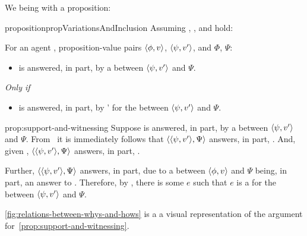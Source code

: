 \begin{note}
 We being with a proposition:

  \begin{restatable}[]{proposition}{propVariationsAndInclusion}
    \label{prop:support-and-witnessing}
    Assuming \linkW{}, \linkH{}, and \issueInclusion{} hold:

    For an agent \vAgent{}, proposition-value pairs \(\langle \phi, v \rangle\), \(\langle \psi, v' \rangle\), and  \(\Phi\), \(\Psi\):

    \begin{itemize}
    \item
      \qWhyV{} is answered, in part, by a \ros{} between \(\langle \psi, v' \rangle\) and \(\Psi\).
    \end{itemize}

    \emph{Only if}

    \begin{itemize}
    \item
      \qHowV{} is answered, in part, by \vAgent{}'  for the \ros{} between \(\langle \psi, v' \rangle\) and \(\Psi\).
    \end{itemize}
    \vspace{-\baselineskip}
  \end{restatable}

  \begin{argument}{prop:support-and-witnessing}
    Suppose \qWhyV{} is answered, in part, by a \ros{} between \(\langle \psi, v' \rangle\) and \(\Psi\).
    From~\linkW{} it is immediately follows that \(\langle \langle \psi, v' \rangle, \Psi \rangle\) answers, in part, \qWhy{}.
    And, given \issueInclusion{}, \(\langle \langle \psi, v' \rangle, \Psi \rangle\) answers, in part, \qHow{}.

    Further, \(\langle \langle \psi, v' \rangle, \Psi \rangle\) answers, in part, \qHow{} due to a \ros{} between \(\langle \phi, v \rangle\) and \(\Psi\) being, in part, an answer to \qWhyV{}.
    Therefore, by \linkH{}, there is some \(e\) such that \(e\) is a  for the \ros{} between \(\langle \psi, v' \rangle\) and \(\Psi\).
  \end{argument}


  \autoref{fig:relations-between-whys-and-hows} is a a visual representation of the argument for~\autoref{prop:support-and-witnessing}.
\end{note}

